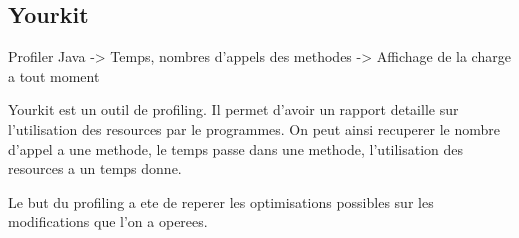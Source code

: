 \subsection{Yourkit}
Profiler Java
-> Temps, nombres d'appels des methodes
-> Affichage de la charge a tout moment

Yourkit est un outil de profiling. Il permet d'avoir un rapport detaille sur l'utilisation des resources par le programmes. On peut ainsi recuperer le nombre d'appel a une methode, le temps passe dans une methode, l'utilisation des resources a un temps donne.

Le but du profiling a ete de reperer les optimisations possibles sur les modifications que l'on a operees.